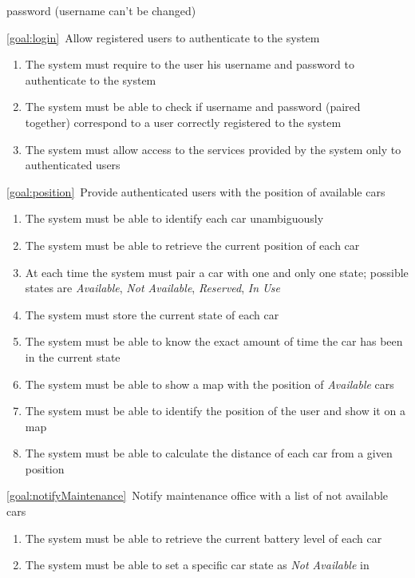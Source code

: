 \begin{description}
\begin{enumerate}[label=\textbf{R\arabic*}]
   				password (username can't be changed)
  			\end{enumerate}
		\item \ref{goal:login}\ Allow registered users to authenticate to the system
			\begin{enumerate}[resume*]
  				\item The system must require to the user his username and password to authenticate
  				to the system
   				\item The system must be able to check if username and password (paired together)
   				correspond to a user correctly registered to the system
   				\item The system must allow access to the services provided by the system only to
   				authenticated users 
			\end{enumerate}
		\item \ref{goal:position}\ Provide authenticated users with the position of available cars
			\begin{enumerate}[resume*]
				\item The system must be able to identify each car unambiguously
  				\item The system must be able to retrieve the current position of each car
  				\item At each time the system must pair a car with one and only one state; possible
  				states are \emph{Available}, \emph{Not Available}, \emph{Reserved}, \emph{In Use}
   				\item The system must store the current state of each car
   				\item The system must be able to know the exact amount of time the car has been in
   				the current state
   				\item The system must be able to show a map with the position of \emph{Available}
   				cars
  				\item The system must be able to identify the position of the user and show it on a
  				map
   				\item The system must be able to calculate the distance of each car from a given
   				position
  			\end{enumerate}
		\item \ref{goal:notifyMaintenance}\ Notify maintenance office with a list of not available
		cars
			\begin{enumerate}[resume*]
   				\item The system must be able to retrieve the current battery level of each car
   				\item The system must be able to set a specific car state as \emph{Not Available} in

\end{enumerate}
\end{description}
